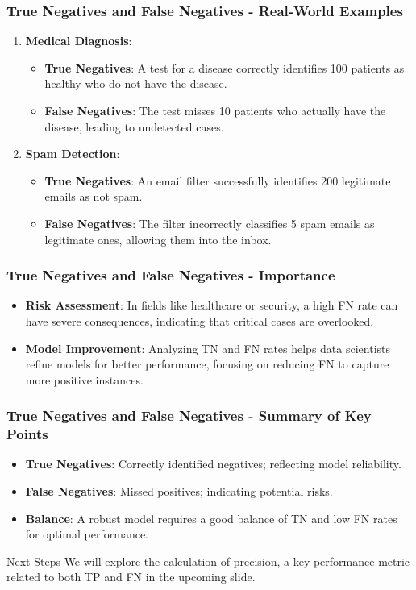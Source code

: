 \documentclass[aspectratio=169]{beamer}
\begin{document}
\begin{frame}[fragile]
  \frametitle{True Negatives and False Negatives - Real-World Examples}
  \begin{enumerate}
    \item \textbf{Medical Diagnosis}:
      \begin{itemize}
        \item \textbf{True Negatives}: A test for a disease correctly identifies 100 patients as healthy who do not have the disease.
        \item \textbf{False Negatives}: The test misses 10 patients who actually have the disease, leading to undetected cases.
      \end{itemize}
    
    \item \textbf{Spam Detection}:
      \begin{itemize}
        \item \textbf{True Negatives}: An email filter successfully identifies 200 legitimate emails as not spam.
        \item \textbf{False Negatives}: The filter incorrectly classifies 5 spam emails as legitimate ones, allowing them into the inbox.
      \end{itemize}
  \end{enumerate}
\end{frame}

\begin{frame}[fragile]
  \frametitle{True Negatives and False Negatives - Importance}
  \begin{itemize}
    \item \textbf{Risk Assessment}: In fields like healthcare or security, a high FN rate can have severe consequences, indicating that critical cases are overlooked.
    \item \textbf{Model Improvement}: Analyzing TN and FN rates helps data scientists refine models for better performance, focusing on reducing FN to capture more positive instances.
  \end{itemize}
\end{frame}

\begin{frame}[fragile]
  \frametitle{True Negatives and False Negatives - Summary of Key Points}
  \begin{itemize}
    \item \textbf{True Negatives}: Correctly identified negatives; reflecting model reliability.
    \item \textbf{False Negatives}: Missed positives; indicating potential risks.
    \item \textbf{Balance}: A robust model requires a good balance of TN and low FN rates for optimal performance.
  \end{itemize}
  \begin{block}{Next Steps}
    We will explore the calculation of precision, a key performance metric related to both TP and FN in the upcoming slide.
  \end{block}
\end{frame}
\end{document}
